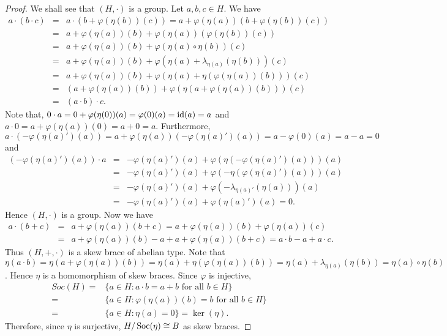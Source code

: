\begin{proof}
We shall see that $(H,\cdot)$ is a group. Let $a,b,c\in H$. We have
	\begin{eqnarray*}
		a\cdot (b\cdot c)&=&a\cdot (b+\varphi(\eta (b))(c))=a+\varphi(\eta (a))(b+\varphi(\eta (b))(c))\\
		&=&a+\varphi(\eta (a))(b)+\varphi(\eta (a))(\varphi(\eta (b))(c))\\
		&=&a+\varphi(\eta(a))(b)+\varphi(\eta(a)\circ \eta(b))(c)\\
		&=&a+\varphi(\eta(a))(b)+\varphi(\eta(a)+\lambda_{\eta(a)}(\eta(b)))(c)\\
		&=&a+\varphi(\eta(a))(b)+\varphi(\eta(a)+\eta(\varphi(\eta(a))(b)))(c)\\
		&=&(a+\varphi(\eta(a))(b))+\varphi(\eta(a+\varphi(\eta(a))(b)))(c)\\
		&=&(a\cdot b)\cdot c.
	\end{eqnarray*}	
Note that, $0\cdot a=0+\varphi(\eta(0))(a)=\varphi(0)(a)=\operatorname{id}(a)=a$ and $a\cdot 0=a+\varphi(\eta(a))(0)=a+0=a$. Furthermore,
$a\cdot (-\varphi(\eta(a)')(a))=a+\varphi(\eta(a))(-\varphi(\eta(a)')(a))=a-\varphi(0)(a)=a-a=0$ and
\begin{eqnarray*}
	(-\varphi(\eta(a)')(a))\cdot a&=&-\varphi(\eta(a)')(a)+\varphi(\eta(-\varphi(\eta(a)')(a)))(a)\\
	&=&-\varphi(\eta(a)')(a)+\varphi(-\eta(\varphi(\eta(a)')(a)))(a)\\
	&=&-\varphi(\eta(a)')(a)+\varphi(-\lambda_{\eta(a)'}(\eta(a)))(a)\\
	&=&-\varphi(\eta(a)')(a)+\varphi(\eta(a)')(a)=0.
\end{eqnarray*}
Hence $(H,\cdot)$ is a group. Now we have
\begin{eqnarray*}
a\cdot (b+c)&=&a+\varphi(\eta(a))(b+c)=a+\varphi(\eta(a))(b)+\varphi(\eta(a))(c)\\
&=&a+\varphi(\eta(a))(b)-a+a+\varphi(\eta(a))(b+c)=a\cdot b-a+a\cdot c.
\end{eqnarray*}
Thus $(H,+,\cdot)$ is a skew brace of abelian type. Note that $\eta(a\cdot b)=\eta(a+\varphi(\eta(a))(b))=\eta(a)+\eta(\varphi(\eta(a))(b))=\eta(a)+\lambda_{\eta(a)}(\eta(b))=\eta(a)\circ\eta(b)$. Hence $\eta$ is a homomorphism of skew braces. Since $\varphi$ is injective, 
\begin{align*}
    Soc(H)=&\{a\in H : a\cdot b=a+b \text{ for all } b\in H\}\\
    =&\{a\in H : \varphi(\eta(a))(b)=b\text{ for all } b\in H\}\\
    =&\{ a\in H : \eta(a)=0\}=\ker(\eta).
    \end{align*}
Therefore, since $\eta$ is surjective, $H/\operatorname{Soc}(\eta)\cong B$ as skew braces.


\end{proof}
